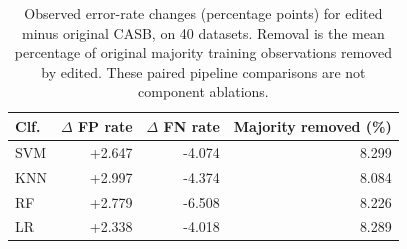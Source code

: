 \begin{table}[pos=!htbp]
\centering\small
\caption{Observed error-rate changes (percentage points) for edited minus original CASB, on 40 datasets. Removal is the mean percentage of original majority training observations removed by edited. These paired pipeline comparisons are not component ablations.}\label{tab:mechanisms}
\begin{tabular}{lrrr}\toprule
Clf. & $\Delta$ FP rate & $\Delta$ FN rate & Majority removed (\%) \\
\midrule
SVM & +2.647 & -4.074 & 8.299 \\
KNN & +2.997 & -4.374 & 8.084 \\
RF & +2.779 & -6.508 & 8.226 \\
LR & +2.338 & -4.018 & 8.289 \\
\bottomrule\end{tabular}
\end{table}

